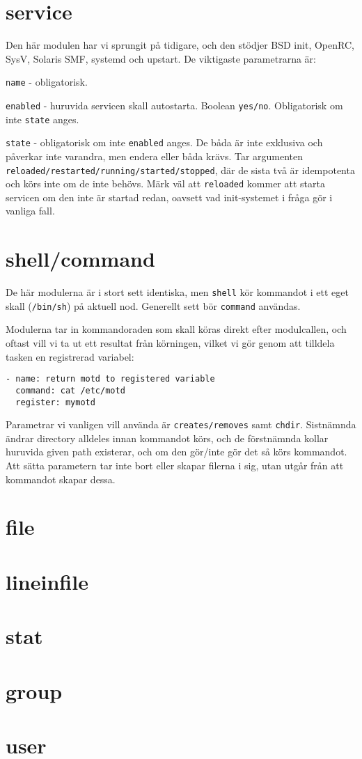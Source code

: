 \section{service}
Den här modulen har vi sprungit på tidigare, och den stödjer BSD init, OpenRC, SysV, Solaris SMF, systemd och upstart. De viktigaste parametrarna är:

\texttt{name} - obligatorisk.

\texttt{enabled} - huruvida servicen skall autostarta. Boolean \texttt{yes/no}. Obligatorisk om inte \texttt{state} anges.

\texttt{state} - obligatorisk om inte \texttt{enabled} anges. De båda är inte exklusiva och påverkar inte varandra,
men endera eller båda krävs. Tar argumenten \verb+reloaded/restarted/running/started/stopped+, där de sista två är idempotenta och körs inte om de inte behövs. Märk väl att \verb+reloaded+ kommer att starta servicen om den inte 
är startad redan, oavsett vad init-systemet i fråga gör i vanliga fall.

\section{shell/command}
De här modulerna är i stort sett identiska, men \texttt{shell} kör kommandot i ett eget skall (\texttt{/bin/sh}) på 
aktuell nod. Generellt sett bör \texttt{command} användas.

Modulerna tar in kommandoraden som skall köras direkt efter modulcallen, och oftast vill vi ta ut ett resultat från 
körningen, vilket vi gör genom att tilldela tasken en registrerad variabel:

\begin{verbatim}
- name: return motd to registered variable
  command: cat /etc/motd
  register: mymotd
\end{verbatim}

Parametrar vi vanligen vill använda är \texttt{creates/removes} samt \texttt{chdir}. Sistnämnda ändrar directory alldeles innan kommandot körs, och de förstnämnda kollar huruvida given path existerar, och om den gör/inte gör det så körs kommandot. Att sätta parametern tar inte bort eller skapar filerna i sig, utan utgår från att kommandot skapar dessa.

\section{file}

\section{lineinfile}

\section{stat}

\section{group}

\section{user}
